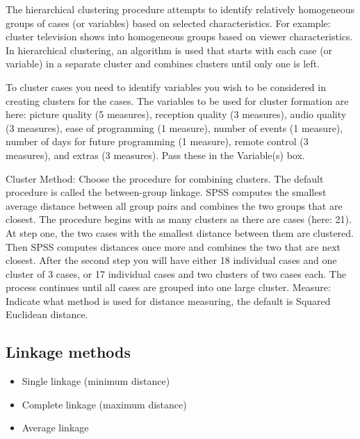 \documentclass[a4paper,12pt]{article}
\begin{document}
	
	
	
	
	\tableofcontents
	\newpage




The hierarchical clustering procedure attempts to identify relatively homogeneous groups of cases (or variables) based on selected
characteristics. For example: cluster television shows into homogeneous groups based on viewer
characteristics. In hierarchical clustering, an algorithm is used that starts with each case (or variable) in a
separate cluster and combines clusters until only one is left.



To cluster cases you need to identify variables you wish to be considered in creating clusters for the cases.
The variables to be used for cluster formation are here: picture quality (5 measures), reception quality (3
measures), audio quality (3 measures), ease of programming (1 measure), number of events (1 measure),
number of days for future programming (1 measure), remote control (3 measures), and extras (3 measures).
Pass these in the Variable(s) box.

Cluster Method: Choose the procedure for combining clusters. The default procedure is called the
between-group linkage. SPSS computes the smallest average distance between all group pairs and
combines the two groups that are closest. The procedure begins with as many clusters as there are cases
(here: 21). At step one, the two cases with the smallest distance between them are clustered. Then SPSS
computes distances once more and combines the two that are next closest. After the second step you will
have either 18 individual cases and one cluster of 3 cases, or 17 individual cases and two clusters of two
cases each. The process continues until all cases are grouped into one large cluster.
Measure: Indicate what method is used for distance measuring, the default is Squared Euclidean distance. 

\subsection{Linkage methods}
\begin{itemize}
	\item  Single linkage (minimum distance)
	\item  Complete linkage (maximum distance)
	\item  Average linkage
\end{itemize}
\end{document}

